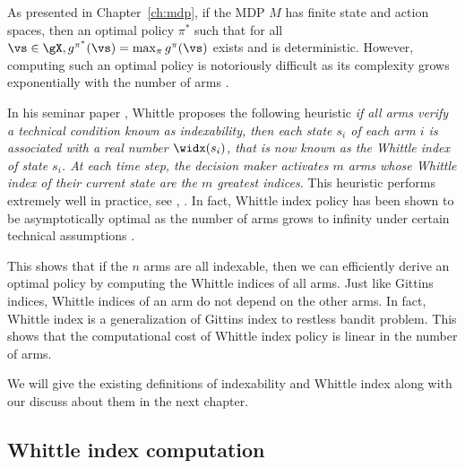 As presented in Chapter~\ref{ch:mdp}, if the MDP $M$ has finite state and action spaces, then an optimal policy $\pi^*$ such that for all $\vs\in\gX, g^{\pi^*}(\vs)=\max_{\pi}g^{\pi}(\vs)$ exists and is deterministic.
However, computing such an optimal policy is notoriously difficult as its complexity grows exponentially with the number of arms \cite{papadimitriou1994complexity}.

In his seminar paper \cite{whittle1988restless}, Whittle proposes the following heuristic \textit{if all arms verify a technical condition known as indexability, then each state $s_i$ of each arm $i$ is associated with a real number $\widx(s_i)$, that is now known as the Whittle index of state $s_i$.
At each time step, the decision maker activates $m$ arms whose Whittle index of their current state are the $m$ greatest indices}.
This heuristic performs extremely well in practice, see \eg, \cite{glazebrook2006some, ansell2003whittle, glazebrook2002index}.
In fact, Whittle index policy has been shown to be asymptotically optimal as the number of arms grows to infinity under certain technical assumptions \cite{verloop2016asymptotically, lott2000optimality, weber1990index}.

This shows that if the $n$ arms are all indexable, then we can efficiently derive an optimal policy by computing the Whittle indices of all arms.
Just like Gittins indices, Whittle indices of an arm do not depend on the other arms.
In fact, Whittle index is a generalization of Gittins index to restless bandit problem.
This shows that the computational cost of Whittle index policy is linear in the number of arms.

We will give the existing definitions of indexability and Whittle index along with our discuss about them in the next chapter.


\subsection{Whittle index computation}

